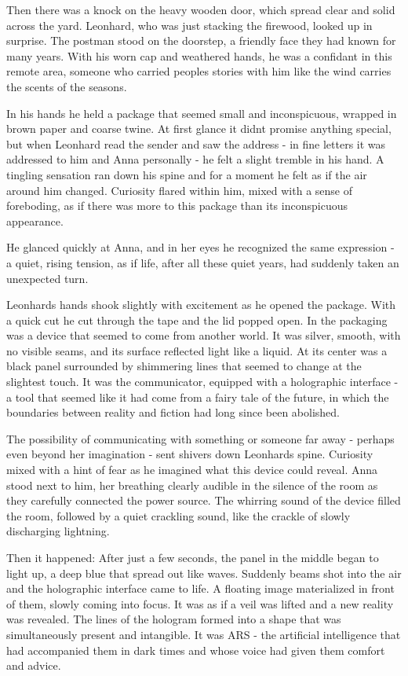 \documentclass[
]{article}
\begin{document}
Then there was a knock on the heavy wooden door, which spread clear and
solid across the yard. Leonhard, who was just stacking the firewood,
looked up in surprise. The postman stood on the doorstep, a friendly
face they had known for many years. With his worn cap and weathered
hands, he was a confidant in this remote area, someone who carried
people\textquotesingle s stories with him like the wind carries the
scents of the seasons.

In his hands he held a package that seemed small and inconspicuous,
wrapped in brown paper and coarse twine. At first glance it
didn\textquotesingle t promise anything special, but when Leonhard read
the sender and saw the address - in fine letters it was addressed to him
and Anna personally - he felt a slight tremble in his hand. A tingling
sensation ran down his spine and for a moment he felt as if the air
around him changed. Curiosity flared within him, mixed with a sense of
foreboding, as if there was more to this package than its inconspicuous
appearance.

He glanced quickly at Anna, and in her eyes he recognized the same
expression - a quiet, rising tension, as if life, after all these quiet
years, had suddenly taken an unexpected turn.

Leonhard\textquotesingle s hands shook slightly with excitement as he
opened the package. With a quick cut he cut through the tape and the lid
popped open. In the packaging was a device that seemed to come from
another world. It was silver, smooth, with no visible seams, and its
surface reflected light like a liquid. At its center was a black panel
surrounded by shimmering lines that seemed to change at the slightest
touch. It was the communicator, equipped with a holographic interface -
a tool that seemed like it had come from a fairy tale of the future, in
which the boundaries between reality and fiction had long since been
abolished.

The possibility of communicating with something or someone far away -
perhaps even beyond her imagination - sent shivers down
Leonhard\textquotesingle s spine. Curiosity mixed with a hint of fear as
he imagined what this device could reveal. Anna stood next to him, her
breathing clearly audible in the silence of the room as they carefully
connected the power source. The whirring sound of the device filled the
room, followed by a quiet crackling sound, like the crackle of slowly
discharging lightning.

Then it happened: After just a few seconds, the panel in the middle
began to light up, a deep blue that spread out like waves. Suddenly
beams shot into the air and the holographic interface came to life. A
floating image materialized in front of them, slowly coming into focus.
It was as if a veil was lifted and a new reality was revealed. The lines
of the hologram formed into a shape that was simultaneously present and
intangible. It was ARS - the artificial intelligence that had
accompanied them in dark times and whose voice had given them comfort
and advice.
\end{document}
